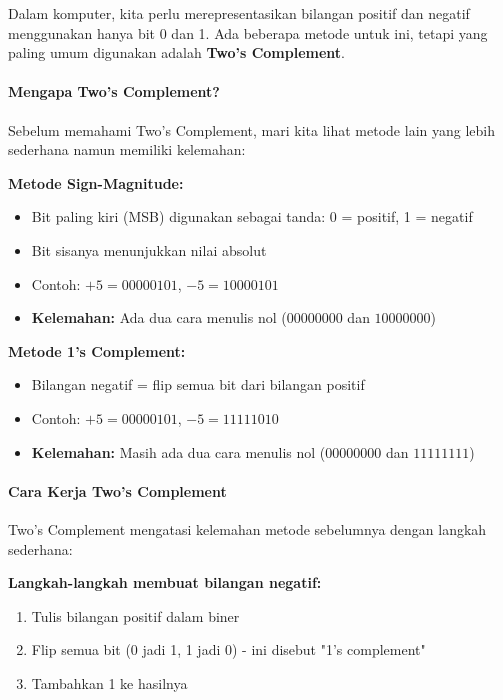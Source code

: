 \documentclass[../main.tex]{subfiles}
\begin{document}
            Dalam komputer, kita perlu merepresentasikan bilangan positif dan negatif menggunakan hanya bit 0 dan 1. Ada beberapa metode untuk ini, tetapi yang paling umum digunakan adalah \textbf{Two's Complement}.

            \paragraph{Mengapa Two's Complement?}
                Sebelum memahami Two's Complement, mari kita lihat metode lain yang lebih sederhana namun memiliki kelemahan:

                \textbf{Metode Sign-Magnitude:}
                \begin{itemize}
                    \item Bit paling kiri (MSB) digunakan sebagai tanda: 0 = positif, 1 = negatif
                    \item Bit sisanya menunjukkan nilai absolut
                    \item Contoh: \(+5 = 00000101\), \(-5 = 10000101\)
                    \item \textbf{Kelemahan:} Ada dua cara menulis nol (\(00000000\) dan \(10000000\))
                \end{itemize}

                \textbf{Metode 1's Complement:}
                \begin{itemize}
                    \item Bilangan negatif = flip semua bit dari bilangan positif
                    \item Contoh: \(+5 = 00000101\), \(-5 = 11111010\)
                    \item \textbf{Kelemahan:} Masih ada dua cara menulis nol (\(00000000\) dan \(11111111\))
                \end{itemize}

            \paragraph{Cara Kerja Two's Complement}
                Two's Complement mengatasi kelemahan metode sebelumnya dengan langkah sederhana:

                \textbf{Langkah-langkah membuat bilangan negatif:}
                \begin{enumerate}
                    \item Tulis bilangan positif dalam biner
                    \item Flip semua bit (0 jadi 1, 1 jadi 0) - ini disebut "1's complement"
                    \item Tambahkan 1 ke hasilnya
                \end{enumerate}
\end{document}

